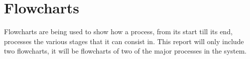 \section{Flowcharts}
Flowcharts are being used to show how a process, from its start till its end, processes the various stages that it can consist in. This report will only include two flowcharts, it will be flowcharts of two of the major processes in the system.

